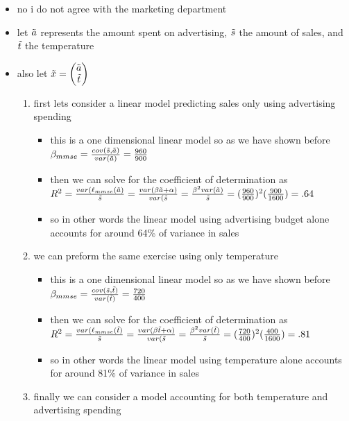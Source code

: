 \documentclass[12pt,twoside]{article}
\begin{document}
\begin{enumerate}
\begin{itemize}
    \color{blue}
    \item no i do not agree with the marketing department 
    \item let $\Tilde{a}$ represents the amount spent on advertising, $\Tilde{s}$ the amount of sales, and $\Tilde{t}$ the temperature 
    \item also let $\Tilde{x}=\begin{pmatrix}
        \Tilde{a}\\ \Tilde{t}
    \end{pmatrix}$
    \begin{enumerate}
        \item first lets consider a linear model predicting sales only using advertising spending 
        \begin{itemize}
            \item this is a one dimensional linear model so as we have shown before $\beta_{mmse}=\frac{cov(\Tilde{s}, \Tilde{a})}{var(\Tilde{a})}=\frac{960}{900}$
            \item then we can solve for the coefficient of determination as $R^2=\frac{var(\ell_{mmse}(\Tilde{a})}{\Tilde{s}}=\frac{var(\beta \Tilde{a}+\alpha)}{var(\Tilde{s}}=\frac{\beta^2 var(\Tilde{a})}{\Tilde{s}}=(\frac{960}{900})^2(\frac{900}{1600})=.64$
            \item so in other words the linear model using advertising budget alone accounts for around 64\% of variance in sales 
        \end{itemize}
        \item we can preform the same exercise using only temperature 
                \begin{itemize}
            \item this is a one dimensional linear model so as we have shown before $\beta_{mmse}=\frac{cov(\Tilde{s}, \Tilde{t})}{var(\Tilde{t})}=\frac{720}{400}$
            \item then we can solve for the coefficient of determination as $R^2=\frac{var(\ell_{mmse}(\Tilde{t})}{\Tilde{s}}=\frac{var(\beta \Tilde{t}+\alpha)}{var(\Tilde{s}}=\frac{\beta^2 var(\Tilde{t})}{\Tilde{s}}=(\frac{720}{400})^2(\frac{400}{1600})=.81$
            \item so in other words the linear model using temperature alone accounts for around 81\% of variance in sales 
        \end{itemize}
        \item finally we can consider a model accounting for both temperature and advertising spending 

\end{enumerate}
\end{itemize}
\end{enumerate}
\end{document}
